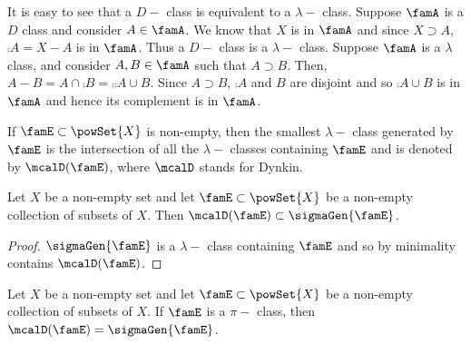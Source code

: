 It is easy to see that a $D-$ class is equivalent to a $\lambda-$ class. Suppose $\famA$ is a $D$ class and
consider $A \in \famA$. We know that $X$ is in $\famA$ and since $X \supset A$, $\comp{A} = X-A$ is in
$\famA$. Thus a $D-$ class is a $\lambda-$ class. Suppose $\famA$ is a $\lambda$ class, and consider $A,B \in
\famA$ such that $A \supset B$. Then, $A-B = A\cap\comp{B} = \comp{\comp{A}\cup B}$. Since $A \supset B$,
$\comp{A}$ and $B$ are disjoint and so $\comp{A}\cup B$ is in $\famA$ and hence its complement is in $\famA$.

If $\famE \subset \powSet{X}$ is non-empty, then the smallest $\lambda-$ class generated by $\famE$ is the
intersection of all the $\lambda-$ classes containing $\famE$ and is denoted by $\mcalD(\famE)$, where
$\mcalD$ stands for Dynkin.
\begin{Lemma}
    Let $X$ be a non-empty set and let $\famE \subset \powSet{X}$ be a non-empty collection of subsets of $X$.
    Then $\mcalD(\famE) \subset \sigmaGen{\famE}$.
\end{Lemma}
\begin{proof}
    $\sigmaGen{\famE}$ is a $\lambda-$ class containing $\famE$ and so by minimality contains $\mcalD(\famE)$.
\end{proof}
\begin{Theorem}
    Let $X$ be a non-empty set and let $\famE \subset \powSet{X}$ be a non-empty collection of subsets of $X$.
    If $\famE$ is a $\pi-$ class, then $\mcalD(\famE) = \sigmaGen{\famE}$.
\end{Theorem}
